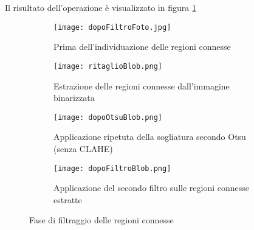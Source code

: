 \noindent Il risultato dell'operazione è visualizzato in figura \ref{fig:filtraggioBlob}

\begin{figure}[h!]

  \centering
  
  \begin{subfigure}[b]{0.8\textwidth}
    \texttt{[image: dopoFiltroFoto.jpg]}
  \caption{Prima dell'individuazione delle regioni connesse}
  \end{subfigure}
  
  \vspace{5mm}
  
  \begin{subfigure}[b]{0.3\textwidth}
    \texttt{[image: ritaglioBlob.png]}
  \caption{Estrazione
delle regioni connesse dall’immagine binarizzata}
  \end{subfigure}
  \begin{subfigure}[b]{0.3\textwidth}
    \texttt{[image: dopoOtsuBlob.png]}
  \caption{Applicazione ripetuta della sogliatura secondo Otsu (senza CLAHE)}
  \end{subfigure}
  \begin{subfigure}[b]{0.3\textwidth}
    \texttt{[image: dopoFiltroBlob.png]}
  \caption{Applicazione del secondo filtro sulle regioni connesse estratte}
  \end{subfigure}
  
  \caption{Fase di filtraggio delle regioni connesse}
  \label{fig:filtraggioBlob}
\end{figure}

